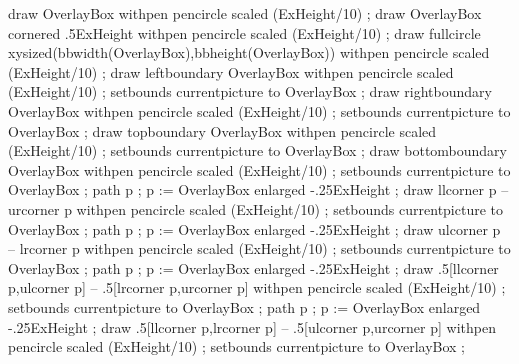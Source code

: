     draw OverlayBox withpen pencircle scaled (ExHeight/10) ;
\stopuseMPgraphic
{}
    draw OverlayBox cornered .5ExHeight withpen pencircle scaled (ExHeight/10) ;
\stopuseMPgraphic
{}
    draw fullcircle xysized(bbwidth(OverlayBox),bbheight(OverlayBox)) withpen pencircle scaled (ExHeight/10) ;
\stopuseMPgraphic
{}
    draw leftboundary OverlayBox withpen pencircle scaled (ExHeight/10) ;
    setbounds currentpicture to OverlayBox ;
\stopuseMPgraphic
{}
    draw rightboundary OverlayBox withpen pencircle scaled (ExHeight/10) ;
    setbounds currentpicture to OverlayBox ;
\stopuseMPgraphic
{}
    draw topboundary OverlayBox withpen pencircle scaled (ExHeight/10) ;
    setbounds currentpicture to OverlayBox ;
\stopuseMPgraphic
{}
    draw bottomboundary OverlayBox withpen pencircle scaled (ExHeight/10) ;
    setbounds currentpicture to OverlayBox ;
\stopuseMPgraphic
{}
    path p ; p := OverlayBox enlarged -.25ExHeight ;
    draw llcorner p -- urcorner p withpen pencircle scaled (ExHeight/10) ;
    setbounds currentpicture to OverlayBox ;
\stopuseMPgraphic
{}
    path p ; p := OverlayBox enlarged -.25ExHeight ;
    draw ulcorner p -- lrcorner p withpen pencircle scaled (ExHeight/10) ;
    setbounds currentpicture to OverlayBox ;
\stopuseMPgraphic
{}
    path p ; p := OverlayBox enlarged -.25ExHeight ;
    draw .5[llcorner p,ulcorner p] -- .5[lrcorner p,urcorner p] withpen pencircle scaled (ExHeight/10) ;
    setbounds currentpicture to OverlayBox ;
\stopuseMPgraphic
{}
    path p ; p := OverlayBox enlarged -.25ExHeight ;
    draw .5[llcorner p,lrcorner p] -- .5[ulcorner p,urcorner p] withpen pencircle scaled (ExHeight/10) ;
    setbounds currentpicture to OverlayBox ;
\stopuseMPgraphic

